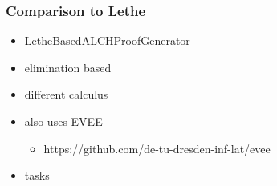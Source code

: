 \documentclass{beamer}
\begin{document}

            \begin{frame}
                \frametitle{Comparison to Lethe }
                 \begin{itemize}
                        \item LetheBasedALCHProofGenerator
                        \item elimination based
                        \item different calculus \cite{KoopmannSchmidt15c}
                        \item also uses EVEE \cite{https://doi.org/10.48550/arxiv.2206.07711}
                        \begin{itemize}
                            \item https://github.com/de-tu-dresden-inf-lat/evee
                        \end{itemize}
                        \item tasks \cite{10.1007/978-3-031-10769-6_16}
                 \end{itemize}
             \end{frame}
\end{document}

